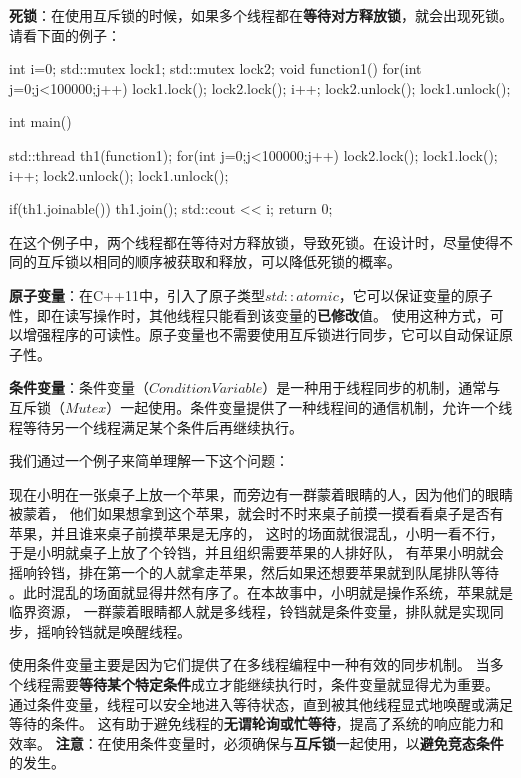 \textbf{死锁}：在使用互斥锁的时候，如果多个线程都在\textbf{等待对方释放锁}，就会出现死锁。请看下面的例子：

\begin{tcode}
int i=0;
std::mutex lock1;
std::mutex lock2;
void function1(){
    for(int j=0;j<100000;j++){
        lock1.lock();
        lock2.lock();
        i++;
        lock2.unlock();
        lock1.unlock();
    }
}

int main() {
    std::thread th1(function1);
    for(int j=0;j<100000;j++){
        lock2.lock();
        lock1.lock();
        i++;
        lock2.unlock();
        lock1.unlock();
    }

    if(th1.joinable())
        th1.join();
    std::cout << i;
    return 0;
}

\end{tcode}

在这个例子中，两个线程都在等待对方释放锁，导致死锁。在设计时，尽量使得不同的互斥锁以相同的顺序被获取和释放，可以降低死锁的概率。

\textbf{原子变量}：在C++11中，引入了原子类型$std::atomic$，它可以保证变量的原子性，即在读写操作时，其他线程只能看到该变量的\textbf{已修改}值。
使用这种方式，可以增强程序的可读性。原子变量也不需要使用互斥锁进行同步，它可以自动保证原子性。

\textbf{条件变量}：条件变量（$Condition Variable$）是一种用于线程同步的机制，通常与互斥锁（$Mutex$）一起使用。条件变量提供了一种线程间的通信机制，允许一个线程等待另一个线程满足某个条件后再继续执行。

我们通过一个例子来简单理解一下这个问题：

现在小明在一张桌子上放一个苹果，而旁边有一群蒙着眼睛的人，因为他们的眼睛被蒙着，
他们如果想拿到这个苹果，就会时不时来桌子前摸一摸看看桌子是否有苹果，并且谁来桌子前摸苹果是无序的，
这时的场面就很混乱，小明一看不行，于是小明就桌子上放了个铃铛，并且组织需要苹果的人排好队，
有苹果小明就会摇响铃铛，排在第一个的人就拿走苹果，然后如果还想要苹果就到队尾排队等待
。此时混乱的场面就显得井然有序了。在本故事中，小明就是操作系统，苹果就是临界资源，
一群蒙着眼睛都人就是多线程，铃铛就是条件变量，排队就是实现同步，摇响铃铛就是唤醒线程。

使用条件变量主要是因为它们提供了在多线程编程中一种有效的同步机制。
当多个线程需要\textbf{等待某个特定条件}成立才能继续执行时，条件变量就显得尤为重要。
通过条件变量，线程可以安全地进入等待状态，直到被其他线程显式地唤醒或满足等待的条件。
这有助于避免线程的\textbf{无谓轮询或忙等待}，提高了系统的响应能力和效率。
\textbf{注意}：在使用条件变量时，必须确保与\textbf{互斥锁}一起使用，以\textbf{避免竞态条件}的发生。

